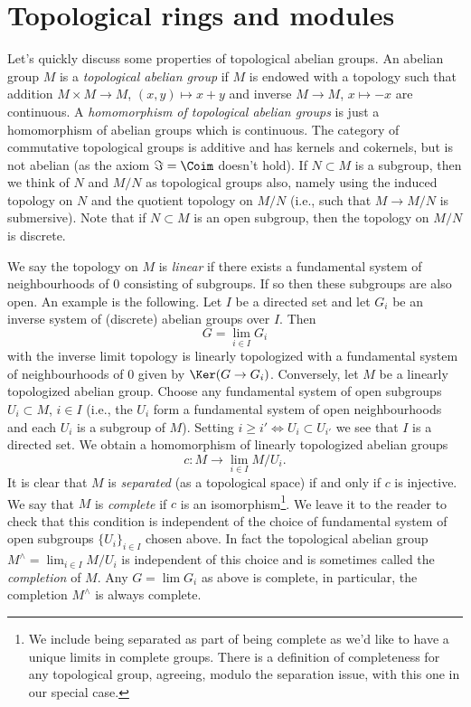\section{Topological rings and modules}
\label{section-topological-ring}

\noindent
Let's quickly discuss some properties of topological abelian groups.
An abelian group $M$ is a {\it topological abelian group} if $M$ is
endowed with a topology such that addition $M \times M \to M$,
$(x, y) \mapsto x + y$ and inverse $M \to M$, $x \mapsto -x$ are
continuous. A {\it homomorphism of topological abelian groups}
is just a homomorphism of abelian groups which is continuous.
The category of commutative topological groups is additive and
has kernels and cokernels, but is not abelian (as the axiom
$\Im = \Coim$ doesn't hold). If $N \subset M$ is a
subgroup, then we think of $N$ and $M/N$ as topological groups
also, namely using the induced topology on $N$ and the quotient
topology on $M/N$ (i.e., such that $M \to M/N$ is submersive).
Note that if $N \subset M$ is an open subgroup, then the topology
on $M/N$ is discrete.

\medskip\noindent
We say the topology on $M$ is {\it linear} if there exists a fundamental
system of neighbourhoods of $0$ consisting of subgroups. If so then these
subgroups are also open. An example is the following. Let $I$ be a directed set
and let $G_i$ be an inverse system of (discrete)
abelian groups over $I$. Then
$$
G = \lim_{i \in I} G_i
$$
with the inverse limit topology is linearly topologized with a fundamental
system of neighbourhoods of $0$ given by $\Ker(G \to G_i)$.
Conversely, let $M$ be a linearly topologized abelian group.
Choose any fundamental system of open subgroups $U_i \subset M$, $i \in I$
(i.e., the $U_i$ form a fundamental system of open neighbourhoods and
each $U_i$ is a subgroup of $M$). Setting
$i \geq i' \Leftrightarrow U_i \subset U_{i'}$ we see that $I$
is a directed set. We obtain a homomorphism of
linearly topologized abelian groups
$$
c : M \longrightarrow \lim_{i \in I} M/U_i.
$$
It is clear that $M$ is {\it separated} (as a topological space)
if and only if $c$ is injective. We say that $M$ is {\it complete}
if $c$ is an isomorphism\footnote{We include being separated as part
of being complete as we'd like to have a unique limits in complete
groups. There is a definition of completeness for any topological group,
agreeing, modulo the separation issue, with this one in our special case.}.
We leave it to the reader to check that this condition is independent of
the choice of fundamental system of open subgroups $\{U_i\}_{i \in I}$
chosen above. In fact the topological abelian group
$M^\wedge = \lim_{i \in I} M/U_i$ is independent of this
choice and is sometimes called the {\it completion} of $M$.
Any $G = \lim G_i$ as above is complete, in particular,
the completion $M^\wedge$ is always complete.

